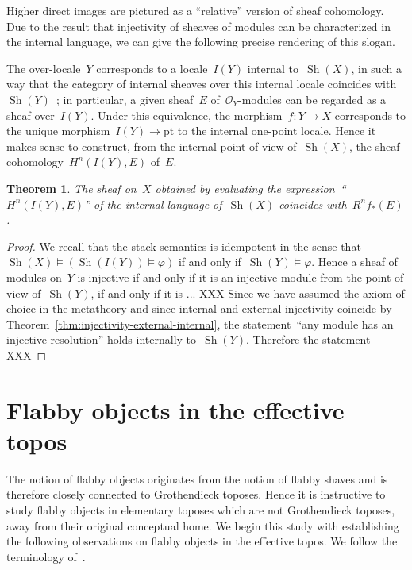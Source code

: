 \documentclass[oneside]{amsart}
\theoremstyle{definition}
\theoremstyle{plain}
\newtheorem{thm}[defn]{Theorem}
\theoremstyle{remark}
\renewcommand{\O}{\mathcal{O}}
\DeclareMathOperator{\Sh}{Sh}
\renewcommand{\_}{\mathpunct{.}\,}
\begin{document}
Higher direct images are pictured as a ``relative'' version of sheaf
cohomology. Due to the result that injectivity of sheaves of modules can be
characterized in the internal language, we can give the following precise
rendering of this slogan.

The over-locale~$Y$ corresponds to a locale~$I(Y)$ internal to~$\Sh(X)$, in
such a way that the category of internal sheaves over this internal locale
coincides with~$\Sh(Y)$~\cite{XXX}; in particular, a given sheaf~$E$ of~$\O_Y$-modules can
be regarded as a sheaf over~$I(Y)$. Under this equivalence, the morphism~$f : Y
\to X$ corresponds to the unique morphism~$I(Y) \to \mathrm{pt}$ to the
internal one-point locale. Hence it makes sense to construct, from the internal
point of view of~$\Sh(X)$, the sheaf cohomology~$H^n(I(Y), E)$ of~$E$.

\begin{thm}The sheaf on~$X$ obtained by evaluating the expression~``$H^n(I(Y),
E)$'' of the internal language of~$\Sh(X)$ coincides with~$R^n
f_*(E)$.\end{thm}

\begin{proof}We recall that the stack semantics is idempotent in the sense
that~$\Sh(X) \models (\Sh(I(Y)) \models \varphi)$ if and only if~$\Sh(Y)
\models \varphi$. Hence a sheaf of modules on~$Y$ is injective if and only if
it is an injective module from the point of view of~$\Sh(Y)$, if and only if it
is ... XXX Since we have assumed the axiom of choice in the metatheory and
since internal and external injectivity coincide by
Theorem~\ref{thm:injectivity-external-internal}, the statement~``any module has
an injective resolution'' holds internally to~$\Sh(Y)$. Therefore the
statement XXX
\end{proof}


\section{Flabby objects in the effective topos}

The notion of flabby objects originates from the notion of flabby shaves and is
therefore closely connected to Grothendieck toposes. Hence it is instructive
to study flabby objects in elementary toposes which are not Grothendieck
toposes, away from their original conceptual home. We begin this study with
establishing the following observations on flabby objects in the effective
topos. We follow the terminology of~\cite{hyland:effective-topos}.
\end{document}
